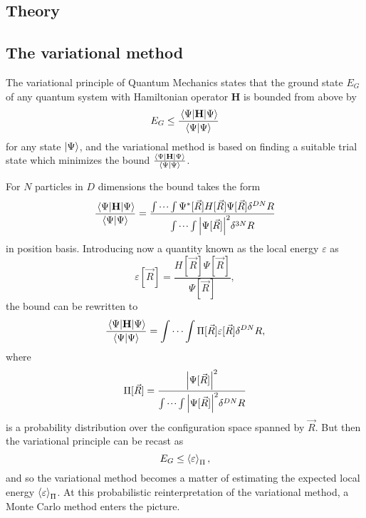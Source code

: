 \documentclass[a4paper,8pt]{article}
\begin{document}
\begin{multicols}{2}
\section{Theory} \label{theory}

\subsection{The variational method}
The variational principle of Quantum Mechanics states that the ground state $E_G$ of any quantum system with Hamiltonian operator $\mathbf{H}$ is bounded from above by
\begin{equation}
E_G \leq \frac{\ev{\mathbf{H}}{\Psi}}{\braket{\Psi}{\Psi}}
\end{equation}
for any state $\ket{\Psi}$, and the variational method is based on finding a suitable trial state which minimizes the bound $\frac{\ev{\mathbf{H}}{\Psi}}{\braket{\Psi}{\Psi}}$.

For $N$ particles in $D$ dimensions the bound takes the form
\begin{align}
\frac{\ev{\mathbf{H}}{\Psi}}{\braket{\Psi}{\Psi}} = \frac{\idotsint \Psi^*[\vec{R}]H[\vec{R}]\Psi[\vec{R}]\delta^{DN}R}{\idotsint \abs{\Psi[\vec{R}]}^2\delta^{3N}R} \nonumber
\end{align}
in position basis. Introducing now a quantity known as the local energy $\varepsilon$ as
\begin{equation}
\varepsilon[\vec{R}] = \frac{H[\vec{R}]\Psi[\vec{R}]}{\Psi[\vec{R}]}, \label{defLocalenergy}
\end{equation}
the bound can be rewritten to
\begin{equation}
\frac{\ev{\mathbf{H}}{\Psi}}{\braket{\Psi}{\Psi}} = \idotsint \Pi[\vec{R}]\varepsilon[\vec{R}] \delta^{DN}R, \nonumber
\end{equation}
where
\begin{equation}
\Pi[\vec{R}] = \frac{\abs{\Psi[\vec{R}]}^2}{\idotsint \abs{\Psi[\vec{R}]}^2\delta^{DN}R} \label{distribution}
\end{equation}
is a probability distribution over the configuration space spanned by $\vec{R}$. But then the variational principle can be recast as
\begin{equation}
E_G \leq \ev{\varepsilon}_\Pi,
\end{equation}
and so the variational method becomes a matter of estimating the expected local energy $\ev{\varepsilon}_\Pi$. At this probabilistic reinterpretation of the variational method, a Monte Carlo method enters the picture.


\end{multicols}
\end{document}
